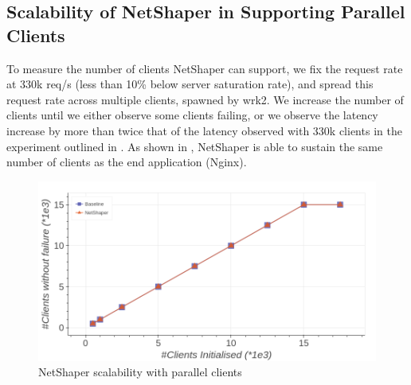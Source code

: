 \subsection{Scalability of NetShaper in Supporting Parallel Clients}
\label{subsec:netshaper-evaluation-num-clients}

To measure the number of clients NetShaper can support, we fix the request rate at 330k req/s (less than 10\% below server saturation rate), and spread this request rate across multiple clients, spawned by wrk2.
We increase the number of clients until we either observe some clients failing, or we observe the latency increase by more than twice that of the latency observed with 330k clients in the experiment outlined in .
As shown in , NetShaper is able to sustain the same number of clients as the end application (Nginx).

\begin{figure}[!htb]
    \centering
    \includegraphics[width=\columnwidth]{figures/netshaper/evaluation/num_clients.png}
    \caption{NetShaper scalability with parallel clients}
    \label{fig:netshaper-eval-parallel-clients}
\end{figure}